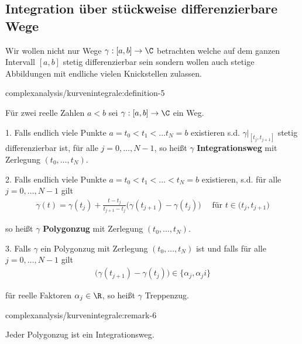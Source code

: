 \documentclass[letterpaper,10pt,german]{jupyterBook}
\begin{document}
\subsection{Integration über stückweise differenzierbare Wege}
\label{\detokenize{complexanalysis/kurvenintegrale:integration-uber-stuckweise-differenzierbare-wege}}
\par
Wir wollen nicht nur Wege \(\gamma:[a,b]\to\C\) betrachten welche auf dem ganzen Intervall \([a,b]\) stetig differenzierbar sein sondern wollen auch stetige Abbildungen mit endliche vielen Knickstellen zulassen.
\begin{definition}{}{complexanalysis/kurvenintegrale:definition-5}



\par
Für zwei reelle Zahlen \(a<b\) sei \(\gamma:[a,b]\to\C\) ein Weg.

\par
1. Falls endlich viele Punkte \(a=t_0<t_1<\ldots t_N =b\) existieren s.d. \(\gamma\rvert_{[t_j,t_{j+1}]}\) stetig differenzierbar ist, für alle \(j=0,\ldots, N-1\), so heißt \(\gamma\) \textbf{Integrationsweg} mit Zerlegung \((t_0,\ldots,t_N)\).

\par
2. Falls endlich viele Punkte \(a=t_0<t_1<\ldots < t_N =b\) existieren, s.d. für alle \(j=0,\ldots, N-1\) gilt
\begin{align*}
\gamma(t) = \gamma(t_j) + \frac{t - t_j}{t_{j+1} - t_j} \big(\gamma(t_{j+1}) - \gamma(t_j))\quad\text{ für } t\in(t_j,t_{j+1}\big)
\end{align*}
\par
so heißt \(\gamma\) \textbf{Polygonzug} mit Zerlegung \((t_0,\ldots,t_N)\).

\par
3. Falls \(\gamma\) ein Polygonzug mit Zerlegung \((t_0,\ldots,t_N)\) ist und falls für alle \(j=0,\ldots,N-1\) gilt
\begin{align*}
\big(\gamma(t_{j+1}) - \gamma(t_j)) \in \{ \alpha_j, \alpha_j i\}
\end{align*}
\par
für reelle Faktoren \(\alpha_j\in\R\), so heißt \(\gamma\) Treppenzug.
\end{definition}
\begin{remark}{}{complexanalysis/kurvenintegrale:remark-6}



\par
Jeder Polygonzug ist ein Integrationsweg.
\end{remark}
\end{document}
